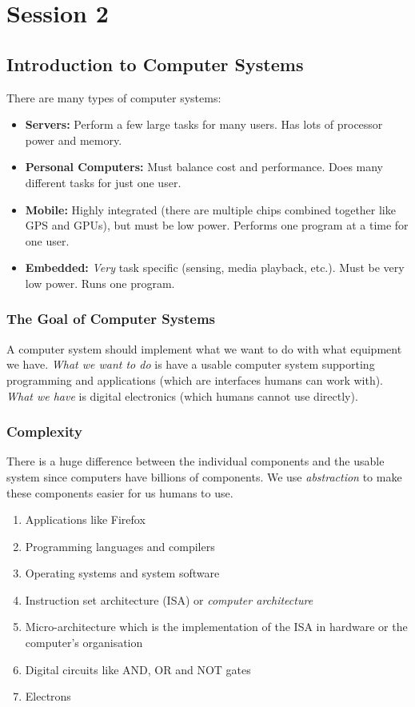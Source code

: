 \section{Session 2}\label{sec:session_2}

\subsection{Introduction to Computer Systems}\label{sub:introduction_to_computer_systems}

There are many types of computer systems:

\begin{itemize}
	\item \textbf{Servers:} Perform a few large tasks for many users. Has lots of processor power and memory.
	\item \textbf{Personal Computers:} Must balance cost and performance. Does many different tasks for just one user.
	\item \textbf{Mobile:} Highly integrated (there are multiple chips combined together like GPS and GPUs), but must be low power. Performs one program at a time for one user.
	\item \textbf{Embedded:} \emph{Very} task specific (sensing, media playback, etc.). Must be very low power. Runs one program.
\end{itemize}

\subsubsection{The Goal of Computer Systems}\label{ssub:the_goal_of_computer_systems}

A computer system should implement what we want to do with what equipment we have.
\emph{What we want to do} is have a usable computer system supporting programming and applications (which are interfaces humans can work with).
\emph{What we have} is digital electronics (which humans cannot use directly).

\subsubsection{Complexity}\label{ssub:complexity}

There is a huge difference between the individual components and the usable system since computers have billions of components.
We use \emph{abstraction} to make these components easier for us humans to use.

\begin{enumerate}
	\item Applications like Firefox
	\item Programming languages and compilers
	\item Operating systems and system software
	\item Instruction set architecture (ISA) or \emph{computer architecture}
	\item Micro-architecture which is the implementation of the ISA in hardware or the computer's organisation
	\item Digital circuits like AND, OR and NOT gates
	\item Electrons
\end{enumerate}

